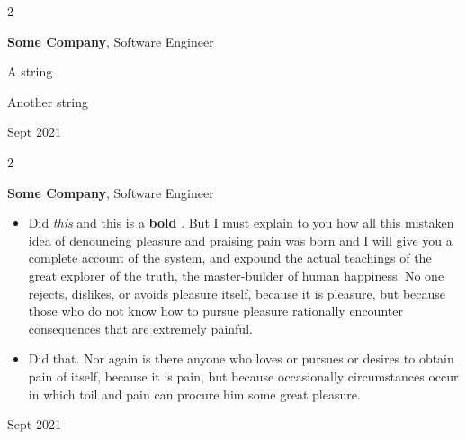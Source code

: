 \documentclass[10pt, letterpaper]{article}
\newenvironment{summary}{
    \begin{description}[
        topsep=0.10 cm,
        parsep=0.10 cm,
        partopsep=0pt,
        itemsep=0pt,
        leftmargin=0.4 cm + 10pt
    ]
}{
    \end{description}
} %
\newenvironment{highlights}{
    \begin{itemize}[
        topsep=0.10 cm,
        parsep=0.10 cm,
        partopsep=0pt,
        itemsep=0pt,
        leftmargin=0.4 cm + 10pt
    ]
}{
    \end{itemize}
} %
\newenvironment{twocolentry}[2][]{
    \onecolentry
    \def\secondColumn{#2}
    \setcolumnwidth{\fill, 4.5 cm}
    \begin{paracol}{2}
}{
    \switchcolumn \raggedleft \secondColumn
    \end{paracol}
    \endonecolentry
} %
\let\hrefWithoutArrow\href
\renewcommand{\href}[2]{\hrefWithoutArrow{#1}{\ifthenelse{\equal{#2}{}}{ }{#2 }\raisebox{.15ex}{\footnotesize \faExternalLink*}}}
\begin{document}
        \vspace{0.2 cm}

        \begin{twocolentry}{
            Sept 2021
        }
            \textbf{Some \textnormal{Company}}, Software Engineer
            \begin{summary}
                \item A string
                \item Another string
            \end{summary}
        \end{twocolentry}


        \vspace{0.2 cm}

        \begin{twocolentry}{
            Sept 2021
        }
            \textbf{Some \textnormal{Company}}, Software Engineer
            \begin{highlights}
                \item Did \textit{this} and this is a \textbf{bold} \href{https://example.com}{link}. But I must explain to you how all this mistaken idea of denouncing pleasure and praising pain was born and I will give you a complete account of the system, and expound the actual teachings of the great explorer of the truth, the master-builder of human happiness. No one rejects, dislikes, or avoids pleasure itself, because it is pleasure, but because those who do not know how to pursue pleasure rationally encounter consequences that are extremely painful.
                \item Did that. Nor again is there anyone who loves or pursues or desires to obtain pain of itself, because it is pain, but because occasionally circumstances occur in which toil and pain can procure him some great pleasure.
            \end{highlights}
        \end{twocolentry}


        \vspace{0.2 cm}
\end{document}
